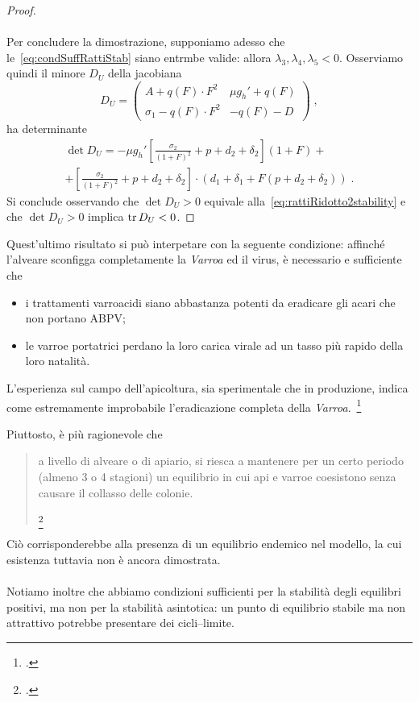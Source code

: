 \begin{proof}
\paragraph{}
Per concludere la dimostrazione, supponiamo adesso che le~\eqref{eq:condSuffRattiStab} siano entrmbe valide:
allora $\lambda_3, \lambda_4, \lambda_5 <0$. Osserviamo quindi il minore $D_U$ della jacobiana
$$D_U =
\begin{pmatrix}
A + q(F) \cdot F^2 & \mu g_h' + q(F) \\
\sigma_1 - q(F) \cdot F^2 & -q(F) -D
\end{pmatrix} \; ,
$$
ha determinante
\begin{multline*}
\det D_U = - \mu g_h' \left[ \frac{\sigma_2}{(1+F)^2} + p + d_2 +\delta_2 \right] (1+F) + \\
+ \left[ \frac{\sigma_2}{(1+F)^2} + p + d_2 +\delta_2 \right] \cdot \left( d_1 +\delta_1 + F(p+d_2+\delta_2) \right)
\; .
\end{multline*}
Si conclude osservando che $\det D_U > 0$ equivale alla~\eqref{eq:rattiRidotto2stability}
e che $\det D_U > 0$ implica $\operatorname{tr} D_U <0$.
\end{proof}

Quest'ultimo risultato si può interpetare con la seguente condizione: affinché l'alveare sconfigga completamente la \emph{Varroa} ed il virus, è necessario e sufficiente che
\begin{itemize}
    \item i trattamenti varroacidi siano abbastanza potenti da eradicare gli acari che non portano ABPV;
    \item le varroe portatrici perdano la loro carica virale ad un tasso più rapido della loro natalità.
\end{itemize}

L'esperienza sul campo dell'apicoltura, sia sperimentale che in produzione, indica come estremamente improbabile l'eradicazione completa della \emph{Varroa}.~\footcite{privFPan,meccanica}

Piuttosto, è più ragionevole che
\blockquote[{\footcite{privFDL}}]{a livello di alveare o di apiario, si riesca
    a mantenere per un certo periodo (almeno 3 o 4 stagioni) un equilibrio in cui api e varroe coesistono senza causare il collasso delle colonie.}

Ciò corrisponderebbe alla presenza di un equilibrio endemico nel modello, la cui esistenza tuttavia non è ancora dimostrata.

\paragraph{}
Notiamo inoltre che abbiamo condizioni sufficienti per la stabilità degli equilibri positivi, ma non per la stabilità asintotica: un punto di equilibrio stabile ma non attrattivo potrebbe presentare dei cicli--limite.

